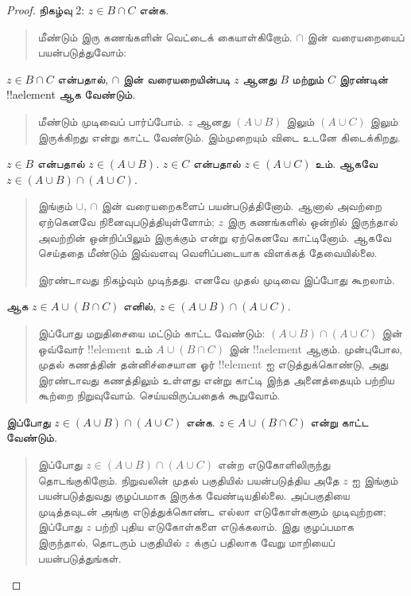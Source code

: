 \documentclass[../../../include/open-logic-section]{subfiles}
\begin{document}
\begin{proof}
நிகழ்வு 2: $z \in B \cap C$ என்க.
\begin{quote}
மீண்டும் இரு கணங்களின் வெட்டைக் கையாள்கிறோம்.
$\cap$ இன் வரையறையைப் பயன்படுத்துவோம்:
\end{quote}
$z \in B \cap C$ என்பதால், $\cap$ இன்
வரையறையின்படி $z$ ஆனது $B$ மற்றும் $C$ இரண்டின்
!!a{element} ஆக வேண்டும்.
\begin{quote}
மீண்டும் முடிவைப் பார்ப்போம். $z$ ஆனது
$(A \cup B)$ இலும் $(A \cup C)$ இலும்
இருக்கிறது என்று காட்ட வேண்டும். இம்முறையும்
விடை உடனே கிடைக்கிறது.
\end{quote}
$z \in B$ என்பதால் $z \in (A \cup B)$.
$z \in C$ என்பதால் $z \in (A \cup C)$ உம்.
ஆகவே $z \in (A \cup B) \cap (A \cup C)$.
\begin{quote}
இங்கும் $\cup$, $\cap$ இன் வரையறைகளைப் பயன்படுத்தினோம்.
ஆனால் அவற்றை ஏற்கெனவே நினைவுபடுத்தியுள்ளோம்; $z$
இரு கணங்களில் ஒன்றில் இருந்தால் அவற்றின் ஒன்றிப்பிலும்
இருக்கும் என்று ஏற்கெனவே காட்டினோம். ஆகவே செய்ததை
மீண்டும் இவ்வளவு வெளிப்படையாக விளக்கத் தேவையில்லை.

இரண்டாவது நிகழ்வும் முடிந்தது. எனவே முதல் முடிவை
இப்போது கூறலாம்.
\end{quote}
ஆக $z \in A \cup (B \cap C)$ எனில்,
$z \in (A \cup B) \cap (A \cup C)$.
\begin{quote}
இப்போது மறுதிசையை மட்டும் காட்ட வேண்டும்:
$(A \cup B) \cap (A \cup C)$ இன் ஒவ்வோர்
!!{element} உம் $A \cup (B \cap C)$ இன்
!!a{element} ஆகும். முன்புபோல, முதல் கணத்தின்
தன்னிச்சையான ஓர் !!{element} ஐ எடுத்துக்கொண்டு,
அது இரண்டாவது கணத்திலும் உள்ளது என்று காட்டி
இந்த அனைத்தையும் பற்றிய கூற்றை நிறுவுவோம்.
செய்யவிருப்பதைக் கூறுவோம்.
\end{quote}

இப்போது $z \in (A \cup B) \cap (A \cup C)$ என்க.
$z \in A \cup (B \cap C)$ என்று காட்ட வேண்டும்.
\begin{quote}
இப்போது $z \in (A \cup B) \cap (A \cup C)$
என்ற எடுகோளிலிருந்து தொடங்குகிறோம். நிறுவலின் முதல்
பகுதியில் பயன்படுத்திய அதே $z$ ஐ இங்கும் பயன்படுத்துவது
குழப்பமாக இருக்க வேண்டியதில்லை. அப்பகுதியை முடித்தவுடன்
அங்கு எடுத்துக்கொண்ட எல்லா எடுகோள்களும் முடிவுற்றன;
இப்போது $z$ பற்றி புதிய எடுகோள்களை எடுக்கலாம்.
இது குழப்பமாக இருந்தால், தொடரும் பகுதியில் $z$ க்குப்
பதிலாக வேறு மாறியைப் பயன்படுத்துங்கள்.


\end{quote}
\end{proof}
\end{document}
